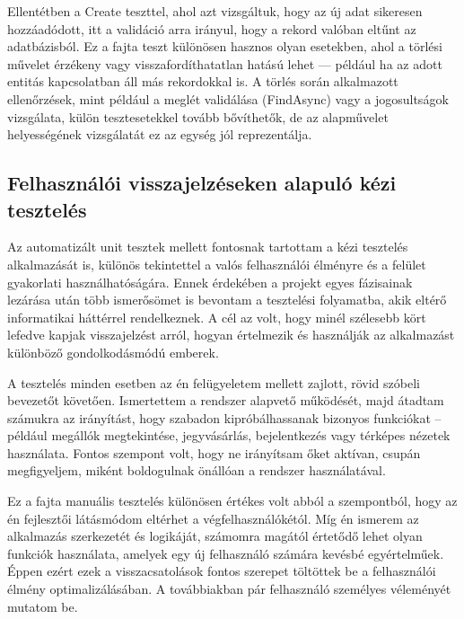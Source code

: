 Ellentétben a Create teszttel, ahol azt vizsgáltuk, hogy az új adat sikeresen hozzáadódott, itt a validáció arra irányul, hogy a rekord valóban eltűnt az adatbázisból. Ez a fajta teszt különösen hasznos olyan esetekben, ahol a törlési művelet érzékeny vagy visszafordíthatatlan hatású lehet — például ha az adott entitás kapcsolatban áll más rekordokkal is. A törlés során alkalmazott ellenőrzések, mint például a meglét validálása (FindAsync) vagy a jogosultságok vizsgálata, külön tesztesetekkel tovább bővíthetők, de az alapművelet helyességének vizsgálatát ez az egység jól reprezentálja.

\subsection{Felhasználói visszajelzéseken alapuló kézi tesztelés}

Az automatizált unit tesztek mellett fontosnak tartottam a kézi tesztelés alkalmazását is, különös tekintettel a valós felhasználói élményre és a felület gyakorlati használhatóságára. Ennek érdekében a projekt egyes fázisainak lezárása után több ismerősömet is bevontam a tesztelési folyamatba, akik eltérő informatikai háttérrel rendelkeznek. A cél az volt, hogy minél szélesebb kört lefedve kapjak visszajelzést arról, hogyan értelmezik és használják az alkalmazást különböző gondolkodásmódú emberek.

A tesztelés minden esetben az én felügyeletem mellett zajlott, rövid szóbeli bevezetőt követően. Ismertettem a rendszer alapvető működését, majd átadtam számukra az irányítást, hogy szabadon kipróbálhassanak bizonyos funkciókat – például megállók megtekintése, jegyvásárlás, bejelentkezés vagy térképes nézetek használata. Fontos szempont volt, hogy ne irányítsam őket aktívan, csupán megfigyeljem, miként boldogulnak önállóan a rendszer használatával.

Ez a fajta manuális tesztelés különösen értékes volt abból a szempontból, hogy az én fejlesztői látásmódom eltérhet a végfelhasználókétól. Míg én ismerem az alkalmazás szerkezetét és logikáját, számomra magától értetődő lehet olyan funkciók használata, amelyek egy új felhasználó számára kevésbé egyértelműek. Éppen ezért ezek a visszacsatolások fontos szerepet töltöttek be a felhasználói élmény optimalizálásában. A továbbiakban pár felhasználó személyes véleményét mutatom be.

